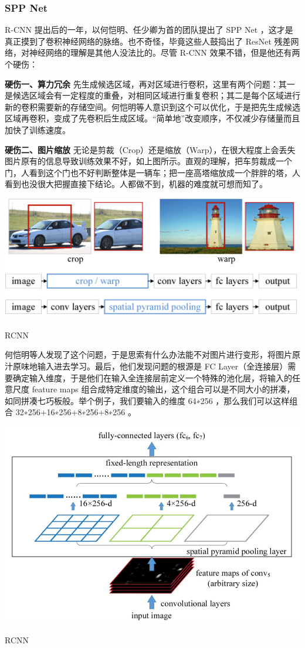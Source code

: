 \subsubsection{SPP Net}
R-CNN 提出后的一年，以何恺明、任少卿为首的团队提出了 SPP Net ，这才是真正摸到了卷积神经网络的脉络。也不奇怪，毕竟这些人鼓捣出了 ResNet 残差网络，对神经网络的理解是其他人没法比的。尽管 R-CNN 效果不错，但是他还有两个硬伤：

\textbf{硬伤一、算力冗余}
先生成候选区域，再对区域进行卷积，这里有两个问题：其一是候选区域会有一定程度的重叠，对相同区域进行重复卷积；其二是每个区域进行新的卷积需要新的存储空间。何恺明等人意识到这个可以优化，于是把先生成候选区域再卷积，变成了先卷积后生成区域。“简单地”改变顺序，不仅减少存储量而且加快了训练速度。

\textbf{硬伤二、图片缩放}
无论是剪裁（Crop）还是缩放（Warp），在很大程度上会丢失图片原有的信息导致训练效果不好，如上图所示。直观的理解，把车剪裁成一个门，人看到这个门也不好判断整体是一辆车；把一座高塔缩放成一个胖胖的塔，人看到也没很大把握直接下结论。人都做不到，机器的难度就可想而知了。
\begin{uscfigure}
	\includegraphics[width=\textwidth]{./Pictures/sppnet_crop_warp.jpg}	
	\caption{RCNN}
\end{uscfigure}
何恺明等人发现了这个问题，于是思索有什么办法能不对图片进行变形，将图片原汁原味地输入进去学习。最后，他们发现问题的根源是 FC Layer（全连接层）需要确定输入维度，于是他们在输入全连接层前定义一个特殊的池化层，将输入的任意尺度 feature maps 组合成特定维度的输出，这个组合可以是不同大小的拼凑，如同拼凑七巧板般。举个例子，我们要输入的维度 64∗256 ，那么我们可以这样组合 32∗256+16∗256+8∗256+8∗256 。
\begin{uscfigure}
	\includegraphics[width=\textwidth,]{./Pictures/sppnet_pool_layer.jpg}	
	\caption{RCNN}
\end{uscfigure}

